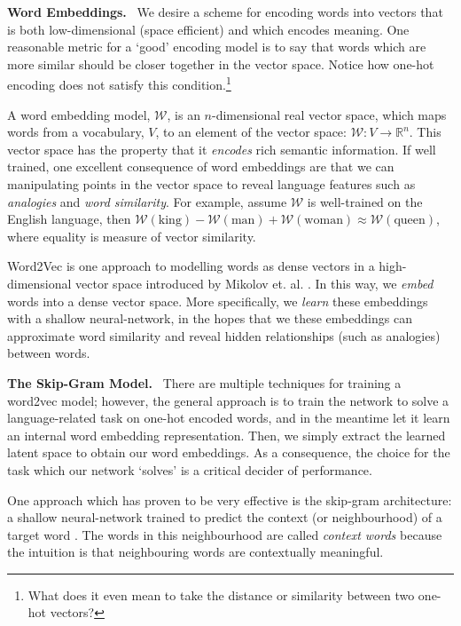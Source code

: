 \documentclass{paper}
\newcommand{\inlineSection}[1]{\vspace{0.5em}\noindent\textbf{#1.}~}
\begin{document}
\inlineSection{Word Embeddings} We desire a scheme for encoding words into vectors that is both low-dimensional (space efficient) and which encodes meaning. One reasonable metric for a `good' encoding model is to say that words which are more similar should be closer together in the vector space. Notice how one-hot encoding does not satisfy this condition.\footnote{What does it even mean to take the distance or similarity between two one-hot vectors?}

A word embedding model, $\mathcal{W}$, is an $n$-dimensional real vector space, which maps words from a vocabulary, $V$, to an element of the vector space: $\mathcal{W}: V \rightarrow \mathbb{R}^n$. This vector space has the property that it \textit{encodes} rich semantic information. If well trained, one excellent consequence of word embeddings are that we can manipulating points in the vector space to reveal language features such as \textit{analogies} and \textit{word similarity}. For example, assume $\mathcal{W}$ is well-trained on the English language, then $\mathcal{W}(\text{king}) - \mathcal{W}(\text{man}) + \mathcal{W}(\text{woman}) \approx \mathcal{W}(\text{queen})$, where equality is measure of vector similarity.

Word2Vec is one approach to modelling words as dense vectors in a high-dimensional vector space introduced by Mikolov et. al. \cite{mikolov2013efficient}. In this way, we \textit{embed} words into a dense vector space. More specifically, we \textit{learn} these embeddings with a shallow neural-network, in the hopes that we these embeddings can approximate word similarity and reveal hidden relationships (such as analogies) between words.

\inlineSection{The Skip-Gram Model} There are multiple techniques for training a word2vec model; however, the general approach is to train the network to solve a language-related task on one-hot encoded words, and in the meantime let it learn an internal word embedding representation. Then, we simply extract the learned latent space to obtain our word embeddings. As a consequence, the choice for the task which our network `solves' is a critical decider of performance.

One approach which has proven to be very effective is the skip-gram architecture: a shallow neural-network trained to predict the context (or neighbourhood) of a target word \cite{goldberg2014word2vec, mikolov2013efficient}. The words in this neighbourhood are called \textit{context words} because the intuition is that neighbouring words are contextually meaningful.
\end{document}
